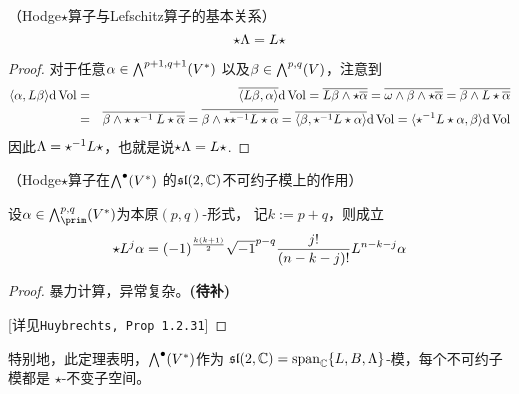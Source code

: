 


\begin{lemma}（Hodge$\star$算子与Lefschitz算子的基本关系）
$$\star\Lambda=L\star$$
\end{lemma}

\begin{proof}
对于任意$\alpha\in\bigwedge\nolimits^{p+1,q+1}(V^*)$
以及$\beta\in\bigwedge\nolimits^{p,q}(V)$，注意到
\begin{eqnarray*}
     \langle \alpha,L\beta \rangle\mathrm{d}\operatorname{Vol}
&=&
     \overline{\langle L\beta,\alpha \rangle}\mathrm{d}\operatorname{Vol}
 =
     \overline{L\beta\wedge\star\overline{\alpha}}
 =
     \overline{\omega\wedge\beta\wedge\star\overline{\alpha}}
 =
     \overline{\beta\wedge L\star\overline{\alpha}}\\
&=&
     \overline{\beta\wedge\star\star^{-1}L\star\overline{\alpha}}
 =
     \overline{\beta\wedge\star\overline{\star^{-1}L\star\alpha}}
 =
     \overline{\langle \beta,\star^{-1}L\star\alpha \rangle}\mathrm{d}\operatorname{Vol}
 =
     \langle \star^{-1}L\star\alpha,\beta \rangle\mathrm{d}\operatorname{Vol}
\end{eqnarray*}
因此$\Lambda=\star^{-1}L\star$，也就是说$\star\Lambda=L\star$.
\end{proof}

\begin{thm}（Hodge$\star$算子在$\bigwedge\nolimits^{\bullet}(V^*)$
的$\mathfrak{sl}(2,\mathbb{C})$不可约子模上的作用）
\label{Hodge star与L的关系 - thm}

设$\afa\in\wedgeform{p,q}_{\prim}(V^*)$为本原$(p,q)$-形式，
记$k:=p+q$，则成立
$$
  \star L^j\alpha
=
  (-1)^{\frac{k(k+1)}{2}}
  \sqrt{-1}^{p-q}
  \frac{j!}{(n-k-j)!}
  L^{n-k-j}\alpha
$$
\end{thm}


\begin{proof}暴力计算，异常复杂。{\color{red}\textbf{(待补)}}

[详见\verb"Huybrechts, Prop 1.2.31"]
\end{proof}
特别地，此定理表明，$\bigwedge\nolimits^{\bullet}(V^*)$作为
$\mathfrak{sl}(2,\mathbb{C})=\operatorname{span}_{\mathbb{C}}\{L,B,\Lambda\}$-模，每个不可约子模都是
$\star$-不变子空间。

